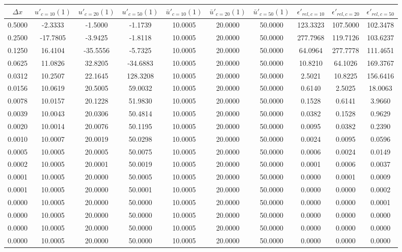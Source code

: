 \begin{tabular}{|c|c|c|c|c|c|c|c|c|c|}
\hline
\textbf{$\Delta x$}&\textbf{$u'_{c=10}(1)$}&\textbf{$u'_{c=20}(1)$}&\textbf{$u'_{c=50}(1)$}&\textbf{$\bar{u}'_{c=10}(1)$}&\textbf{$\bar{u}'_{c=20}(1)$}&\textbf{$\bar{u}'_{c=50}(1)$}&\textbf{$\epsilon'_{rel,c=10}$}&\textbf{$\epsilon'_{rel,c=20}$}&\textbf{$\epsilon'_{rel,c=50}$}\\\hline
0.5000&-2.3333&-1.5000&-1.1739&10.0005&20.0000&50.0000&123.3323&107.5000&102.3478\\\hline
0.2500&-17.7805&-3.9425&-1.8118&10.0005&20.0000&50.0000&277.7968&119.7126&103.6237\\\hline
0.1250&16.4104&-35.5556&-5.7325&10.0005&20.0000&50.0000&64.0964&277.7778&111.4651\\\hline
0.0625&11.0826&32.8205&-34.6883&10.0005&20.0000&50.0000&10.8210&64.1026&169.3767\\\hline
0.0312&10.2507&22.1645&128.3208&10.0005&20.0000&50.0000&2.5021&10.8225&156.6416\\\hline
0.0156&10.0619&20.5005&59.0032&10.0005&20.0000&50.0000&0.6140&2.5025&18.0063\\\hline
0.0078&10.0157&20.1228&51.9830&10.0005&20.0000&50.0000&0.1528&0.6141&3.9660\\\hline
0.0039&10.0043&20.0306&50.4814&10.0005&20.0000&50.0000&0.0382&0.1528&0.9629\\\hline
0.0020&10.0014&20.0076&50.1195&10.0005&20.0000&50.0000&0.0095&0.0382&0.2390\\\hline
0.0010&10.0007&20.0019&50.0298&10.0005&20.0000&50.0000&0.0024&0.0095&0.0596\\\hline
0.0005&10.0005&20.0005&50.0075&10.0005&20.0000&50.0000&0.0006&0.0024&0.0149\\\hline
0.0002&10.0005&20.0001&50.0019&10.0005&20.0000&50.0000&0.0001&0.0006&0.0037\\\hline
0.0001&10.0005&20.0000&50.0005&10.0005&20.0000&50.0000&0.0000&0.0001&0.0009\\\hline
0.0001&10.0005&20.0000&50.0001&10.0005&20.0000&50.0000&0.0000&0.0000&0.0002\\\hline
0.0000&10.0005&20.0000&50.0000&10.0005&20.0000&50.0000&0.0000&0.0000&0.0001\\\hline
0.0000&10.0005&20.0000&50.0000&10.0005&20.0000&50.0000&0.0000&0.0000&0.0000\\\hline
0.0000&10.0005&20.0000&50.0000&10.0005&20.0000&50.0000&0.0000&0.0000&0.0000\\\hline
0.0000&10.0005&20.0000&50.0000&10.0005&20.0000&50.0000&0.0000&0.0000&0.0000\\\hline
\end{tabular}
